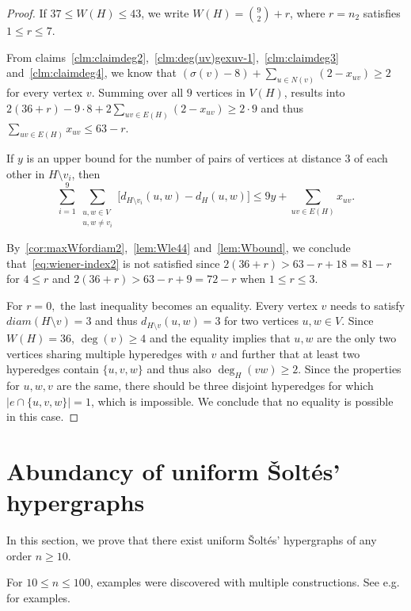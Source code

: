 \documentclass[a4paper,11pt]{article}
\newcommand*{\abs}[1]{\lvert #1\rvert}
\newcommand{\diam}{diam}
\begin{document}
\begin{proof}
If $37\le W(H)\le 43$, we write $W(H)=\binom{9}{2}+r$, where $r=n_2$ satisfies $1\le r\le 7$.

From claims~\ref{clm:claimdeg2},~\ref{clm:deg(uv)gexuv-1},~\ref{clm:claimdeg3} and~\ref{clm:claimdeg4}, we know that $(\sigma(v)-8)+\sum_{u \in N(v)} (2-x_{uv})\ge 2$ for every vertex $v$.
Summing over all $9$ vertices in $V(H)$, results into
$2(36+r)-9\cdot 8+2\sum_{uv \in E(H)}(2-x_{uv})\ge 2\cdot 9$ and thus $\sum_{uv \in E(H)} x_{uv}\le 63-r.$

If $y$ is an upper bound for the number of pairs of vertices at distance $3$ of each other in $H \setminus v_i$, then
$$\sum_{i=1}^{9}\sum_{\substack{u, w \in V \\ u, w \neq v_i}} \big[d_{H \setminus v_i}(u, w) - d_H(u, w)\big] \le 9y+ \sum_{uv \in E(H)} x_{uv}. $$

By~\cref{cor:maxWfordiam2},~\cref{lem:Wle44} and~\cref{lem:Wbound}, we conclude  that~\eqref{eq:wiener-index2} is not satisfied since $2(36+r) > 63-r+18=81-r$ for $4 \le r$ and $2(36+r) > 63-r+9=72-r$ when $1 \le r \le 3$.

For $r=0,$ the last inequality becomes an equality. Every vertex $v$ needs to satisfy $\diam(H \setminus v)=3$ and thus $d_{H \setminus v}(u,w)=3$ for two vertices $u,w \in V.$
Since $W(H)=36$, $\deg(v) \ge 4$ and the equality implies that $u,w$ are the only two vertices sharing multiple hyperedges with $v$ and further that at least two hyperedges contain $\{u,v,w\}$ and thus also $\deg_H(vw) \ge 2.$
Since the properties for $u,w,v$ are the same, there should be three disjoint hyperedges for which $\abs{ e \cap \{u,v,w\}}=1$, which is impossible. We conclude that no equality is possible in this case.
\end{proof}


\section{Abundancy of uniform \v Solt\'es' hypergraphs}\label{sec:abundancy}


In this section, we prove that there exist uniform \v Solt\'es' hypergraphs of any order $n \ge 10$.

For $10 \le n \le 100$, examples were discovered with multiple constructions. See e.g.~\cite[Sec. 3 \& app A]{Tiwari25thesis} for examples.
\end{document}
